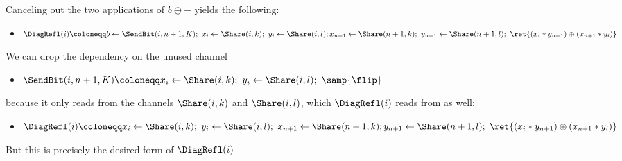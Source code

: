\begin{itemize}
\begin{itemize}
\end{itemize}
Canceling out the two applications of $b \oplus -$ yields the following:
\begin{itemize}
\item $\DiagRefl(i) \coloneqq b \leftarrow \SendBit(i,n+1,K); \ x_i \leftarrow \Share(i,k); \ y_i \leftarrow \Share(i,l); \\ x_{n+1} \leftarrow \Share(n+1,k); \ y_{n+1} \leftarrow \Share(n+1,l); \ \ret{(x_i * y_{n+1}) \oplus (x_{n+1} * y_i)}$
\end{itemize}
We can drop the dependency on the unused channel
\begin{itemize}
\item $\SendBit(i,n+1,K) \coloneqq x_i \leftarrow \Share(i,k); \ y_i \leftarrow \Share(i,l); \ \samp{\flip}$
\end{itemize}
because it only reads from the channels $\Share(i,k)$ and $\Share(i,l)$, which $\DiagRefl(i)$ reads from as well:
\begin{itemize}
\item $\DiagRefl(i) \coloneqq x_i \leftarrow \Share(i,k); \ y_i \leftarrow \Share(i,l); \ x_{n+1} \leftarrow \Share(n+1,k); \\ y_{n+1} \leftarrow \Share(n+1,l); \ \ret{(x_i * y_{n+1}) \oplus (x_{n+1} * y_i)}$
\end{itemize}
But this is precisely the desired form of $\DiagRefl(i)$.


\end{itemize}
